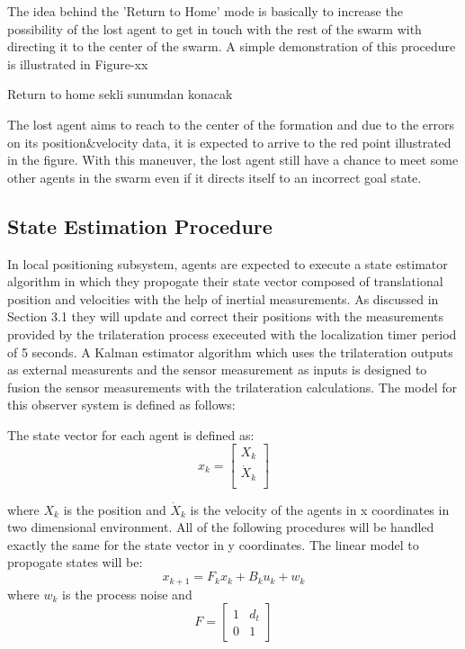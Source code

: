 \documentclass[twoside]{article}
\begin{document}
	The idea behind the 'Return to Home' mode is basically to increase the possibility of the lost agent to get in touch with the rest of the swarm with directing it to the center of the swarm. A simple demonstration of this procedure is illustrated in Figure-xx
	
	
	Return to home sekli sunumdan konacak
	
	
	The lost agent aims to reach to the center of the formation and due to the errors on its position$\&$velocity data, it is expected to arrive to the red point illustrated in the figure. With this maneuver, the lost agent still have a chance to meet some other agents in the swarm even if it directs itself to an incorrect goal state. 
	
	
	\subsection{State Estimation Procedure}
	In local positioning subsystem, agents are expected to execute a state estimator algorithm in which they propogate their state vector composed of translational position and velocities with the help of inertial measurements. As discussed in Section 3.1 they will update and correct their positions with the measurements provided by the trilateration process execeuted with the localization timer period of 5 seconds. A Kalman estimator algorithm which uses the trilateration outputs as external measurents and the sensor measurement as inputs is designed to fusion the sensor measurements with the trilateration calculations. The model for this observer system is defined as follows:
	
	The state vector for each agent is defined as:
	\begin{equation}
        x_k = \begin{bmatrix}
            X_k \\
            \dot{X}_k\\
                \end{bmatrix}
	\end{equation}
	
	where $X_k$ is the position and $\dot{X}_k$ is the velocity of the agents in x coordinates in two dimensional environment. All of the following procedures will be handled exactly the same for the state vector in y coordinates.
	The linear model to propogate states will be:
	\begin{equation}
  x_{k+1} = F_k     x_{k} + B_ku_k + w_k
	\end{equation}
	where $w_k$ is the process noise and 
	\begin{equation}
   F = \begin{bmatrix}
1 & d_t\\
0 & 1
\end{bmatrix}   
	\end{equation}
	
\end{document}
